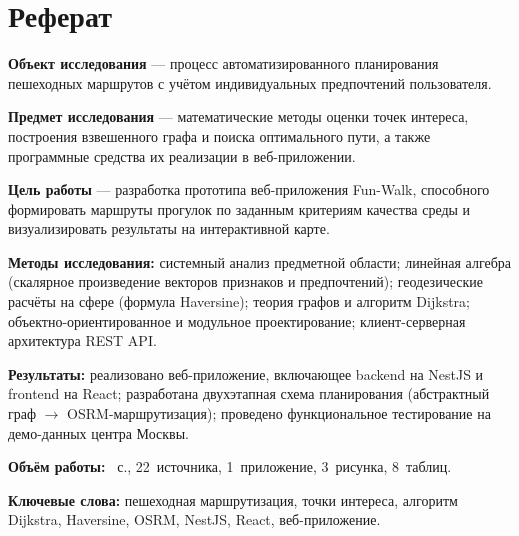 \chapter*{Реферат}

\textbf{Объект исследования} --- процесс автоматизированного планирования пешеходных
маршрутов с учётом индивидуальных предпочтений пользователя.

\textbf{Предмет исследования} --- математические методы оценки точек интереса,
построения взвешенного графа и поиска оптимального пути, а также программные
средства их реализации в веб-приложении.

\textbf{Цель работы} --- разработка прототипа веб-приложения Fun-Walk, способного
формировать маршруты прогулок по заданным критериям качества среды и визуализировать
результаты на интерактивной карте.

\textbf{Методы исследования:} системный анализ предметной области; линейная алгебра
(скалярное произведение векторов признаков и предпочтений); геодезические расчёты
на сфере (формула Haversine); теория графов и алгоритм Dijkstra; объектно-ориентированное
и модульное проектирование; клиент-серверная архитектура REST API.

\textbf{Результаты:} реализовано веб-приложение, включающее backend на NestJS и
frontend на React; разработана двухэтапная схема планирования (абстрактный граф
$\to$ OSRM-маршрутизация); проведено функциональное тестирование на демо-данных
центра Москвы.

\textbf{Объём работы:} \pageref{LastPage}~с., 22~источника, 1~приложение, 3~рисунка, 8~таблиц.

\textbf{Ключевые слова:} пешеходная маршрутизация, точки интереса, алгоритм Dijkstra,
Haversine, OSRM, NestJS, React, веб-приложение.

\clearpage

